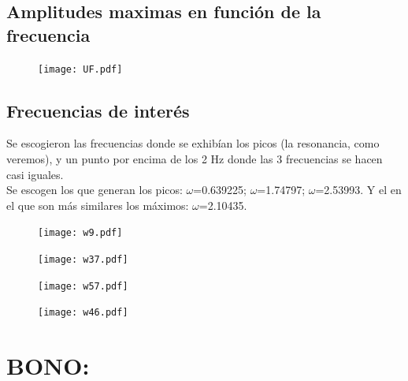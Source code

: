 \documentclass[11pt,letterpaper]{exam}
\begin{document}
\subsection{Amplitudes maximas en función de la frecuencia}
\begin{figure}[H]
\centering
\texttt{[image: UF.pdf]}
\end{figure}

\subsection{Frecuencias de interés}
Se escogieron las frecuencias donde se exhibían los picos (la resonancia, como veremos), y un punto por encima de los 2 Hz donde las 3 frecuencias se hacen casi iguales.\\
Se escogen los que generan los picos: $\omega$=0.639225; $\omega$=1.74797;  $\omega$=2.53993. Y el en el que son más similares los máximos: $\omega$=2.10435.
\begin{figure}[H]
\centering
\texttt{[image: w9.pdf]}
\end{figure}

\begin{figure}[H]
\centering
\texttt{[image: w37.pdf]}
\end{figure}

\begin{figure}[H]
\centering
\texttt{[image: w57.pdf]}
\end{figure}

\begin{figure}[H]
\centering
\texttt{[image: w46.pdf]}
\end{figure}

\section{BONO:}
\end{document}
